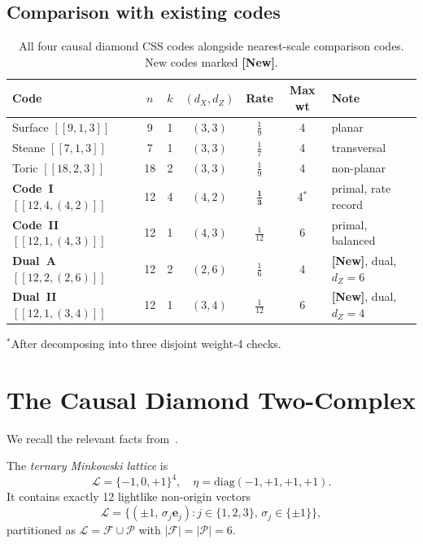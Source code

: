 \documentclass[12pt,a4paper]{article}
\theoremstyle{plain}
\theoremstyle{definition}
\theoremstyle{remark}
\newcommand{\Lat}{\mathscr{L}}
\newcommand{\FS}{\mathcal{F}}
\newcommand{\PS}{\mathcal{P}}
\newcommand{\NEW}{\textcolor{newcolor}{\textbf{[New]}}}
\begin{document}
\subsection{Comparison with existing codes}

\begin{table}[h]
\centering
\caption{All four causal diamond CSS codes alongside nearest-scale
  comparison codes. New codes marked \NEW.}
\label{tab:comparison}
\small
\begin{tabular}{lcccccl}
\toprule
Code & $n$ & $k$ & $(d_X,d_Z)$ & Rate & Max wt & Note \\
\midrule
Surface $[[9,1,3]]$   & 9  & 1  & $(3,3)$ & $\tfrac{1}{9}$  & 4 & planar \\
Steane $[[7,1,3]]$    & 7  & 1  & $(3,3)$ & $\tfrac{1}{7}$  & 4 & transversal \\
Toric $[[18,2,3]]$    & 18 & 2  & $(3,3)$ & $\tfrac{1}{9}$  & 4 & non-planar \\
\midrule
\textbf{Code~I}   $[[12,4,(4,2)]]$  & 12 & 4 & $(4,2)$ & $\mathbf{\tfrac{1}{3}}$ & 4$^*$ & primal, rate record \\
\textbf{Code~II}  $[[12,1,(4,3)]]$  & 12 & 1 & $(4,3)$ & $\tfrac{1}{12}$ & 6 & primal, balanced \\
\textbf{Dual~A}   $[[12,2,(2,6)]]$  & 12 & 2 & $(2,6)$ & $\tfrac{1}{6}$ & 4 & \NEW, dual, $d_Z=6$ \\
\textbf{Dual~II}  $[[12,1,(3,4)]]$  & 12 & 1 & $(3,4)$ & $\tfrac{1}{12}$ & 6 & \NEW, dual, $d_Z=4$ \\
\bottomrule
\end{tabular}
\end{table}

\noindent${}^*$After decomposing into three disjoint weight-4 checks.

\section{The Causal Diamond Two-Complex}\label{sec:geometry}

We recall the relevant facts from~\cite{SchmittCD}.

The \emph{ternary Minkowski lattice} is
\[
\Lat = \{-1,0,+1\}^4, \quad \eta = \mathrm{diag}(-1,+1,+1,+1).
\]
It contains exactly 12 lightlike non-origin vectors
\[
\mathcal{L} = \{(\pm1,\, \sigma_j\bm{e}_j) : j\in\{1,2,3\},\,\sigma_j\in\{\pm1\}\},
\]
partitioned as $\mathcal{L} = \FS \cup \PS$ with $|\FS|=|\PS|=6$.
\end{document}
